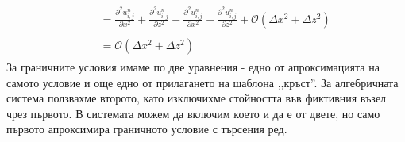 \documentclass[12pt]{article}
\numberwithin{equation}{section}
\begin{document}
\begin{equation}
\begin{aligned}
\begin{aligned}
        \end{aligned}
        \\
        &
        \begin{aligned}
            = \frac{\partial^2 u^n_{i,j}}{\partial x^2} + \frac{\partial^2 u^n_{i,j}}{\partial z^2}
            - \frac{\partial^2 u^n_{i,j}}{\partial x^2} - \frac{\partial^2 u^n_{i,j}}{\partial z^2}
            + \mathcal{O}(\Delta x^2 + \Delta z^2)
        \end{aligned}
        \\
        &
        \begin{aligned}
            = \mathcal{O}(\Delta x^2 + \Delta z^2)
        \end{aligned}
    \end{aligned}
\end{equation}
За граничните условия имаме по две уравнения - едно от апроксимацията на самото условие и още едно от прилагането на шаблона ,,кръст''. За алгебричната система ползвахме второто, като изключихме стойността във фиктивния възел чрез първото. В системата можем да включим което и да е от двете, но само първото апроксимира граничното условие с търсения ред.
\end{document}
